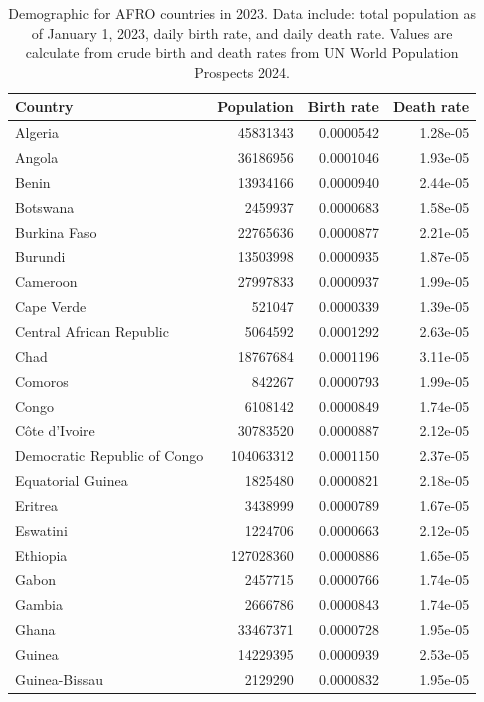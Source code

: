 \documentclass[
]{book}
\begin{document}
\begin{table}
\centering
\caption{\label{tab:demographics}Demographic for AFRO countries in 2023. Data include: total population as of January 1, 2023, daily birth rate, and daily death rate. Values are calculate from crude birth and death rates from UN World Population Prospects 2024.}
\centering
\begin{tabular}[t]{l|r|r|r}
\hline
Country & Population & Birth rate & Death rate\\
\hline
Algeria & 45831343 & 0.0000542 & 1.28e-05\\
\hline
Angola & 36186956 & 0.0001046 & 1.93e-05\\
\hline
Benin & 13934166 & 0.0000940 & 2.44e-05\\
\hline
Botswana & 2459937 & 0.0000683 & 1.58e-05\\
\hline
Burkina Faso & 22765636 & 0.0000877 & 2.21e-05\\
\hline
Burundi & 13503998 & 0.0000935 & 1.87e-05\\
\hline
Cameroon & 27997833 & 0.0000937 & 1.99e-05\\
\hline
Cape Verde & 521047 & 0.0000339 & 1.39e-05\\
\hline
Central African Republic & 5064592 & 0.0001292 & 2.63e-05\\
\hline
Chad & 18767684 & 0.0001196 & 3.11e-05\\
\hline
Comoros & 842267 & 0.0000793 & 1.99e-05\\
\hline
Congo & 6108142 & 0.0000849 & 1.74e-05\\
\hline
Côte d’Ivoire & 30783520 & 0.0000887 & 2.12e-05\\
\hline
Democratic Republic of Congo & 104063312 & 0.0001150 & 2.37e-05\\
\hline
Equatorial Guinea & 1825480 & 0.0000821 & 2.18e-05\\
\hline
Eritrea & 3438999 & 0.0000789 & 1.67e-05\\
\hline
Eswatini & 1224706 & 0.0000663 & 2.12e-05\\
\hline
Ethiopia & 127028360 & 0.0000886 & 1.65e-05\\
\hline
Gabon & 2457715 & 0.0000766 & 1.74e-05\\
\hline
Gambia & 2666786 & 0.0000843 & 1.74e-05\\
\hline
Ghana & 33467371 & 0.0000728 & 1.95e-05\\
\hline
Guinea & 14229395 & 0.0000939 & 2.53e-05\\
\hline
Guinea-Bissau & 2129290 & 0.0000832 & 1.95e-05\\

\end{tabular}
\end{table}
\end{document}
